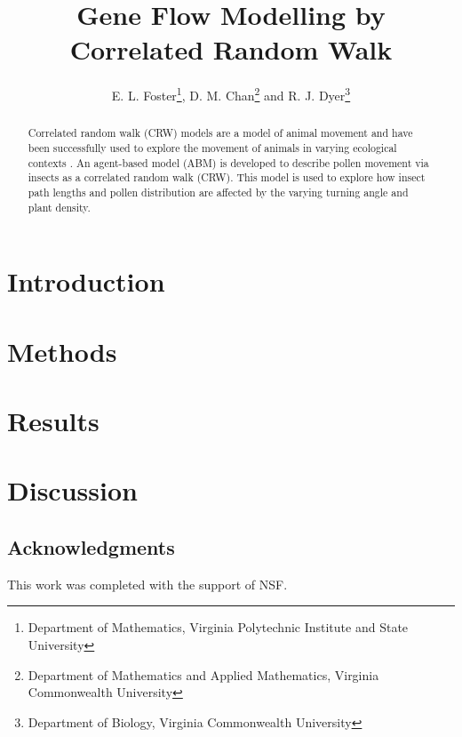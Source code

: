 \documentclass{article}
\title{Gene Flow Modelling by Correlated Random Walk}
\author{E. L. Foster\thanks{Department of Mathematics, Virginia Polytechnic Institute and State
University}, D. M. Chan\thanks{Department of Mathematics and Applied Mathematics, Virginia
Commonwealth University} and R. J. Dyer\thanks{Department of Biology, Virginia Commonwealth
University}}
\begin{document}
\maketitle

\begin{abstract} 
  Correlated random walk (CRW) models are a model of animal movement \cite{Prasad05} and have been
  successfully used to explore the movement of animals in varying ecological contexts
  \cite{Bartumeus07}. An agent-based model (ABM) is developed to describe pollen movement via insects
  as a correlated random walk (CRW). This model is used to explore how insect path lengths and pollen
  distribution are affected by the varying turning angle and plant density.  
\end{abstract}

\section{Introduction}
  
\section{Methods}
  
\section{Results}
  
\section{Discussion}
  
\subsection*{Acknowledgments}
This work was completed with the support of NSF.


\end{document}
